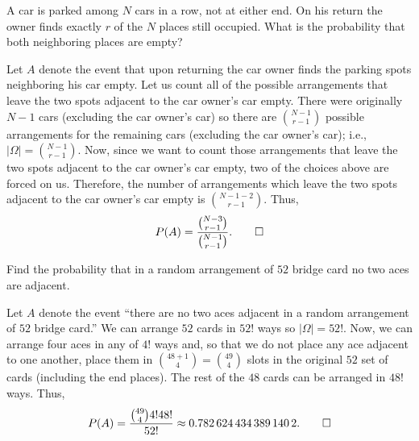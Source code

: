\begin{problem}[Handout 2, \# 15]
  A car is parked among \(N\) cars in a row, not at either end. On his
  return the owner finds exactly \(r\) of the \(N\) places still
  occupied. What is the probability that both neighboring places are empty?
\end{problem}
\begin{solution*}
  Let \(A\) denote the event that upon returning the car owner finds the
  parking spots neighboring his car empty. Let us count all of the possible
  arrangements that leave the two spots adjacent to the car owner's car
  empty. There were originally \(N-1\) cars (excluding the car owner's car)
  so there are \(\binom{N-1}{r-1}\) possible arrangements for the remaining
  cars (excluding the car owner's car); i.e.,
  \(|\Omega|=\binom{N-1}{r-1}\). Now, since we want to count those
  arrangements that leave the two spots adjacent to the car owner's car
  empty, two of the choices above are forced on us. Therefore, the number
  of arrangements which leave the two spots adjacent to the car owner's car
  empty is \(\binom{N-1-2}{r-1}\). Thus,
  \[
    P(A)=\frac{\binom{N-3}{r-1}}{\binom{N-1}{r-1}}.\qedhere
  \]
\end{solution*}

\begin{problem}[Handout 2, \# 16]
  Find the probability that in a random arrangement of \(52\) bridge card
  no two aces are adjacent.
\end{problem}
\begin{solution*}
  Let \(A\) denote the event ``there are no two aces adjacent in a random
  arrangement of \(52\) bridge card.'' We can arrange \(52\) cards in
  \(52!\) ways so \(|\Omega|=52!\). Now, we can arrange four aces in any of
  \(4!\) ways and, so that we do not place any ace adjacent to one another,
  place them in \(\binom{48+1}{4}=\binom{49}{4}\) slots in the original
  \(52\) set of cards (including the end places). The rest of the \(48\)
  cards can be arranged in \(48!\) ways. Thus,
  \[
    P(A)=\frac{\binom{49}{4}4!48!}{52!}\approx\num{0.7826244343891402}.\qedhere
  \]
\end{solution*}


